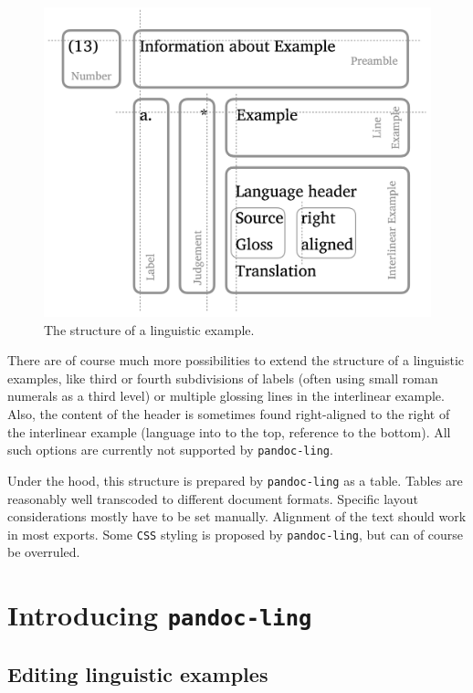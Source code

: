 \documentclass[
]{article}
\begin{document}
\begin{figure}
\centering
\includegraphics{figure/ExampleStructure.png}
\caption{The structure of a linguistic example.}
\end{figure}

There are of course much more possibilities to extend the structure of a
linguistic examples, like third or fourth subdivisions of labels (often
using small roman numerals as a third level) or multiple glossing lines
in the interlinear example. Also, the content of the header is sometimes
found right-aligned to the right of the interlinear example (language
into to the top, reference to the bottom). All such options are
currently not supported by \texttt{pandoc-ling}.

Under the hood, this structure is prepared by \texttt{pandoc-ling} as a
table. Tables are reasonably well transcoded to different document
formats. Specific layout considerations mostly have to be set manually.
Alignment of the text should work in most exports. Some \texttt{CSS}
styling is proposed by \texttt{pandoc-ling}, but can of course be
overruled.

\hypertarget{introducing-pandoc-ling}{%
\section{\texorpdfstring{Introducing
\texttt{pandoc-ling}}{Introducing pandoc-ling}}\label{introducing-pandoc-ling}}

\hypertarget{editing-linguistic-examples}{%
\subsection{Editing linguistic
examples}\label{editing-linguistic-examples}}
\end{document}
